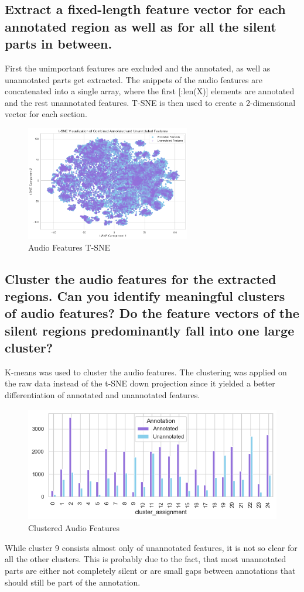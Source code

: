 \subsection{Extract a fixed-length feature vector for each annotated region as well as for all the silent parts in
between. }
\label{sec:Audio Features:b}

First the unimportant features are excluded and the annotated, as well as unannotated parts get extracted.
The snippets of the audio features are concatenated into a single array, where the first [:len(X)] elements are annotated and the rest unannotated features. T-SNE is then used to create a 2-dimensional vector for each section.

\begin{figure}[htbp]
    \centering
    \includegraphics[width=0.5\linewidth, height=5cm]{figs/Audio Features T-SNE.png}
    \caption{Audio Features T-SNE}
    \label{fig:Audio Features T-SNE}
\end{figure}


\subsection{Cluster the audio features for the extracted regions. Can you identify meaningful clusters of audio
features? Do the feature vectors of the silent regions predominantly fall into one large cluster?}
\label{sec:Audio Features:c}

K-means was used to cluster the audio features. The clustering was applied on the raw data instead of the t-SNE down projection since it yielded a better differentiation of annotated and unannotated features.

\begin{figure}[htbp]
    \centering
    \includegraphics[width=0.5\linewidth, height=5cm]{figs/Clustered Audio Features.png}
    \caption{Clustered Audio Features}
    \label{fig:Clustered Audio Features}
\end{figure}
While cluster 9 consists almost only of unannotated features, it is not so clear for all the other clusters. This is probably due to the fact, that most unannotated parts are either not completely silent or are small gaps between annotations that should still be part of the annotation.

